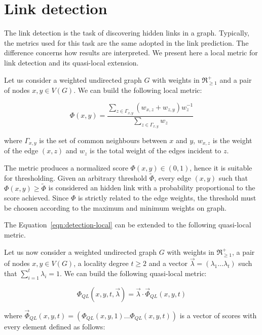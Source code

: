 \section{Link detection}
\label{sec:link-detection}

The link detection is the task of discovering hidden links in a graph. 
Typically, the metrics used for this task are the same adopted in the link prediction. 
The difference concerns how results are interpreted.
We present here a local metric for link detection and its quasi-local extension.

Let us consider a weighted undirected graph $G$ with weights in $\Re_{\geq1}^{+}$ and a pair of nodes $x,y\in V(G)$.
We can build the following local metric:


\begin{equation}
\label{eqn:detection-local}
\Phi(x,y)=
\frac{\sum\limits_{z\in\Gamma_{x,y}}(w_{x,z}+w_{z,y})w_{z}^{-1}}
{\sum\limits_{z\in\Gamma_{x,y}}w_{z}}
\end{equation}

where 
$\Gamma_{x,y}$ is the set of common neighbours between $x$ and $y$,
$w_{x,z}$ is the weight of the edge $(x,z)$ and
$w_{z}$ is the total weight of the edges incident to $z$.

The metric produces a normalized score $\Phi(x,y)\in(0,1)$, hence it is suitable for thresholding.
Given an arbitrary threshold $\tilde{\Phi}$, every edge $(x,y)$ such that $\Phi(x,y)\geq\tilde{\Phi}$ is considered an hidden link with a probability proportional to the score achieved.
Since $\Phi$ is strictly related to the edge weights, the threshold must be choosen according to the maximum and minimum weights on graph.

The Equation~\ref{eqn:detection-local} can be extended to the following quasi-local metric.

Let us now consider a weighted undirected graph $G$ with weights in $\Re_{\geq1}^{+}$, a pair of nodes $x,y\in V(G)$, a locality degree $t\geq 2$ and a vector $\vec{\lambda}=(\lambda_{1}\ldots\lambda_{t})$ such that $\sum_{i=1}^{t}\lambda_{i}=1$. 
We can build the following quasi-local metric:

\begin{equation}
\label{eqn:detection-quasi-local-1}
\Phi_{QL}(x,y,t,\vec{\lambda})=\vec{\lambda}\cdot\vec{\Phi}_{QL}(x,y,t)
\end{equation}

where $\vec{\Phi}_{QL}(x,y,t)=(\Phi_{QL}(x,y,1)\ldots\Phi_{QL}(x,y,t))$ is a vector of scores with every element defined as follows:

